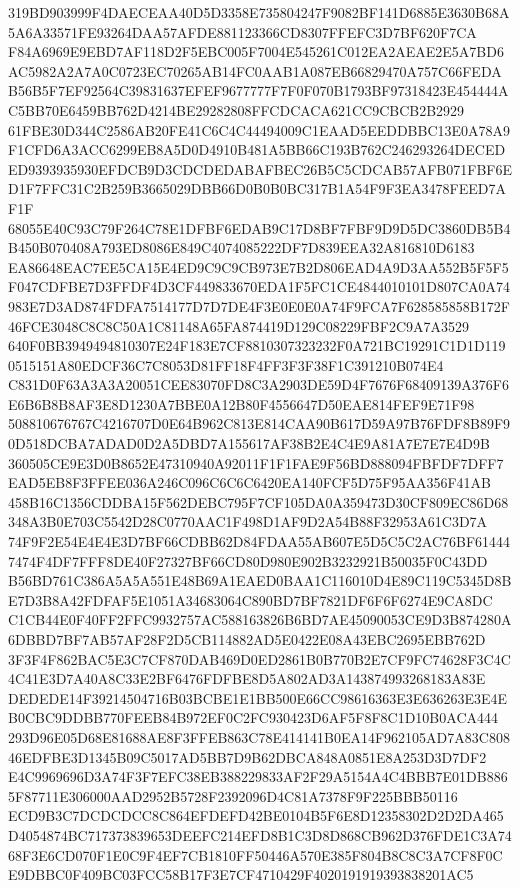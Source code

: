 \documentclass[UTF8,fontset=fandol,zihao=-4,a4paper]{ctexart}
\begin{document}
{{319BD903999F4DAECEAA40D5D3358E735804247F9082BF141D6885E3630B68A5A6A33571FE93264DAA57AFDE881123366CD8307FFEFC3D7BF620F7CA
F84A6969E9EBD7AF118D2F5EBC005F7004E545261C012EA2AEAE2E5A7BD6AC5982A2A7A0C0723EC70265AB14FC0AAB1A087EB66829470A757C66FEDA
B56B5F7EF92564C39831637EFEF9677777F7F0F070B1793BF97318423E454444AC5BB70E6459BB762D4214BE29282808FFCDCACA621CC9CBCB2B2929
61FBE30D344C2586AB20FE41C6C4C44494009C1EAAD5EEDDBBC13E0A78A9F1CFD6A3ACC6299EB8A5D0D4910B481A5BB66C193B762C246293264DECED
ED9393935930EFDCB9D3CDCDEDABAFBEC26B5C5CDCAB57AFB071FBF6ED1F7FFC31C2B259B3665029DBB66D0B0B0BC317B1A54F9F3EA3478FEED7AF1F
68055E40C93C79F264C78E1DFBF6EDAB9C17D8BF7FBF9D9D5DC3860DB5B4B450B070408A793ED8086E849C4074085222DF7D839EEA32A816810D6183
EA86648EAC7EE5CA15E4ED9C9C9CB973E7B2D806EAD4A9D3AA552B5F5F5F047CDFBE7D3FFDF4D3CF449833670EDA1F5FC1CE4844010101D807CA0A74
983E7D3AD874FDFA7514177D7D7DE4F3E0E0E0A74F9FCA7F628585858B172F46FCE3048C8C8C50A1C81148A65FA874419D129C08229FBF2C9A7A3529
640F0BB3949494810307E24F183E7CF8810307323232F0A721BC19291C1D1D1190515151A80EDCF36C7C8053D81FF18F4FF3F3F38F1C391210B074E4
C831D0F63A3A3A20051CEE83070FD8C3A2903DE59D4F7676F68409139A376F6E6B6B8B8AF3E8D1230A7BBE0A12B80F4556647D50EAE814FEF9E71F98
508810676767C4216707D0E64B962C813E814CAA90B617D59A97B76FDF8B89F90D518DCBA7ADAD0D2A5DBD7A155617AF38B2E4C4E9A81A7E7E7E4D9B
360505CE9E3D0B8652E47310940A92011F1F1FAE9F56BD888094FBFDF7DFF7EAD5EB8F3FFEE036A246C096C6C6C6420EA140FCF5D75F95AA356F41AB
458B16C1356CDDBA15F562DEBC795F7CF105DA0A359473D30CF809EC86D68348A3B0E703C5542D28C0770AAC1F498D1AF9D2A54B88F32953A61C3D7A
74F9F2E54E4E4E3D7BF66CDBB62D84FDAA55AB607E5D5C5C2AC76BF614447474F4DF7FFF8DE40F27327BF66CD80D980E902B3232921B50035F0C43DD
B56BD761C386A5A5A551E48B69A1EAED0BAA1C116010D4E89C119C5345D8BE7D3B8A42FDFAF5E1051A34683064C890BD7BF7821DF6F6F6274E9CA8DC
C1CB44E0F40FF2FFC9932757AC588163826B6BD7AE45090053CE9D3B874280A6DBBD7BF7AB57AF28F2D5CB114882AD5E0422E08A43EBC2695EBB762D
3F3F4F862BAC5E3C7CF870DAB469D0ED2861B0B770B2E7CF9FC74628F3C4C4C41E3D7A40A8C33E2BF6476FDFBE8D5A802AD3A143874993268183A83E
DEDEDE14F39214504716B03BCBE1E1BB500E66CC98616363E3E636263E3E4EB0CBC9DDBB770FEEB84B972EF0C2FC930423D6AF5F8F8C1D10B0ACA444
293D96E05D68E81688AE8F3FFEB863C78E414141B0EA14F962105AD7A83C80846EDFBE3D1345B09C5017AD5BB7D9B62DBCA848A0851E8A253D3D7DF2
E4C9969696D3A74F3F7EFC38EB388229833AF2F29A5154A4C4BBB7E01DB8865F87711E306000AAD2952B5728F2392096D4C81A7378F9F225BBB50116
ECD9B3C7DCDCDCC8C864EFDEFD42BE0104B5F6E8D12358302D2D2DA465D4054874BC717373839653DEEFC214EFD8B1C3D8D868CB962D376FDE1C3A74
68F3E6CD070F1E0C9F4EF7CB1810FF50446A570E385F804B8C8C3A7CF8F0CE9DBBC0F409BC03FCC58B17F3E7CF4710429F4020191919393838201AC5
}}
\end{document}
